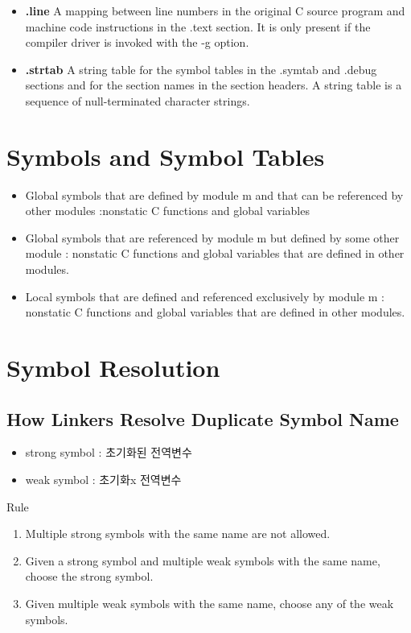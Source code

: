 \begin{itemize}
    \item \textbf{.line} A mapping between line numbers in the original C source program and machine code instructions in the .text section. It is only present if the compiler driver is invoked with the -g option.
    \item \textbf{.strtab} A string table for the symbol tables in the .symtab and .debug sections and for the section names in the section headers. A string table is a sequence of null-terminated character strings.
\end{itemize}

\section{Symbols and Symbol Tables}

\begin{itemize}
    \item Global symbols that are defined by module m and that can be referenced by other modules :nonstatic C functions and global variables
    \item Global symbols that are referenced by module m but defined by some other module : nonstatic C functions and global variables that are defined in other modules.
    \item Local symbols that are defined and referenced exclusively by module m : nonstatic C functions and global variables that are defined in other modules.
\end{itemize}

\section{Symbol Resolution}

\subsection{How Linkers Resolve Duplicate Symbol Name}

\begin{itemize}
    \item strong symbol : 초기화된 전역변수
    \item weak symbol : 초기화x 전역변수
\end{itemize}

Rule
\begin{enumerate}
    \item Multiple strong symbols with the same name are not allowed.
    \item Given a strong symbol and multiple weak symbols with the same name, choose the strong symbol.
    \item Given multiple weak symbols with the same name, choose any of the weak symbols.
\end{enumerate}

